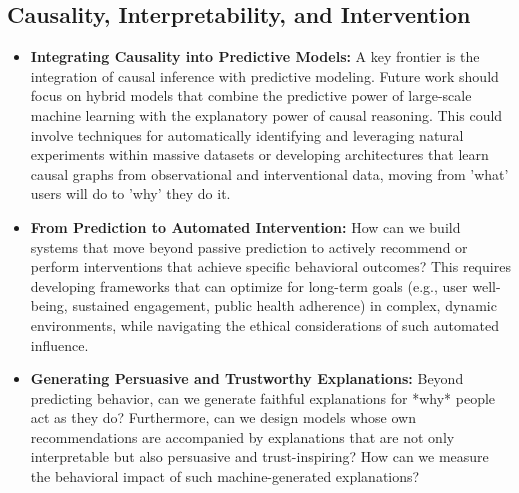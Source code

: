 \subsection*{Causality, Interpretability, and Intervention}
\begin{itemize}
    \item \textbf{Integrating Causality into Predictive Models:} A key frontier is the integration of causal inference with predictive modeling. Future work should focus on hybrid models that combine the predictive power of large-scale machine learning with the explanatory power of causal reasoning. This could involve techniques for automatically identifying and leveraging natural experiments within massive datasets or developing architectures that learn causal graphs from observational and interventional data, moving from 'what' users will do to 'why' they do it.
    
    \item \textbf{From Prediction to Automated Intervention:} How can we build systems that move beyond passive prediction to actively recommend or perform interventions that achieve specific behavioral outcomes? This requires developing frameworks that can optimize for long-term goals (e.g., user well-being, sustained engagement, public health adherence) in complex, dynamic environments, while navigating the ethical considerations of such automated influence.

    \item \textbf{Generating Persuasive and Trustworthy Explanations:} Beyond predicting behavior, can we generate faithful explanations for *why* people act as they do? Furthermore, can we design models whose own recommendations are accompanied by explanations that are not only interpretable but also persuasive and trust-inspiring? How can we measure the behavioral impact of such machine-generated explanations?
\end{itemize}

